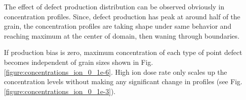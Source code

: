 \documentclass[a4paper]{article}
\begin{document}
    \newpage
    The effect of defect production distribution can be observed obviously in concentration profiles. Since, defect production has peak at around half of the grain, the concentration profiles are taking shape under same behavior and reaching maximum at the center of domain, then waning through boundaries.

    If production bias is zero, maximum concentration of each type of point defect becomes independent of grain sizes shown in Fig. \ref{figure:concentrations_ion_0_1e-6}. High ion dose rate only scales up the concentration levels without making any significant change in profiles (see Fig. \ref{figure:concentrations_ion_0_1e-3}).
      \begin{figure}[h!]  %
        \centering
        \qquad

\end{figure}
\end{document}
